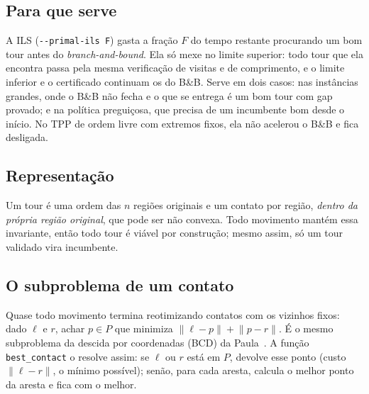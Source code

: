\documentclass[11pt,a4paper]{article}
\theoremstyle{plain}\newtheorem{proposicao}{Proposição}
\theoremstyle{definition}\newtheorem{definicao}{Definição}
\theoremstyle{plain}\newtheorem{teorema}{Teorema}
\theoremstyle{plain}\newtheorem{lema}{Lema}
\newcommand{\norm}[1]{\lVert#1\rVert}
\newcommand{\code}[1]{\texttt{\small #1}}
\begin{document}
\subsection{Para que serve}
A ILS (\code{-{}-primal-ils F}) gasta a fração \(F\) do tempo restante procurando um bom tour antes do \emph{branch-and-bound}. Ela só mexe no limite superior: todo tour que ela encontra passa pela mesma verificação de visitas e de comprimento, e o limite inferior e o certificado continuam os do B\&B. Serve em dois casos: nas instâncias grandes, onde o B\&B não fecha e o que se entrega é um bom tour com gap provado; e na política preguiçosa, que precisa de um incumbente bom desde o início. No TPP de ordem livre com extremos fixos, ela não acelerou o B\&B e fica desligada.

\subsection{Representação}
Um tour é uma ordem das \(n\) regiões originais e um contato por região, \emph{dentro da própria região original}, que pode ser não convexa. Todo movimento mantém essa invariante, então todo tour é viável por construção; mesmo assim, só um tour validado vira incumbente.

\subsection{O subproblema de um contato}\label{sec:melhorcontato}
Quase todo movimento termina reotimizando contatos com os vizinhos fixos: dado \(\ell\) e \(r\), achar \(p\in P\) que minimiza \(\norm{\ell-p}+\norm{p-r}\). É o mesmo subproblema da descida por coordenadas (BCD) da Paula~\cite{paula}. A função \code{best\_contact} o resolve assim: se \(\ell\) ou \(r\) está em \(P\), devolve esse ponto (custo \(\norm{\ell-r}\), o mínimo possível); senão, para cada aresta, calcula o melhor ponto da aresta e fica com o melhor.
\end{document}
